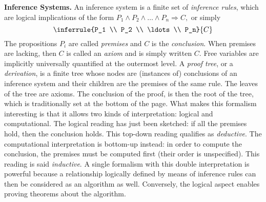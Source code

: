 \textbf{Inference Systems.} An inference system is a finite set of
\emph{inference rules}, which are logical implications of the form
\(P_1 \wedge P_2 \wedge \ldots \wedge P_n \Rightarrow C,\) or simply
\[
\inferrule
  {P_1 \\ P_2 \\ \ldots \\ P_n}
  {C}
\]
The propositions \(P_i\) are called \emph{premises} and \(C\) is the
\emph{conclusion}. When premi\-ses are lacking, then \(C\) is called
an \emph{axiom} and is simply written \(C\). Free variables are
implicitly universally quantified at the outermost level. A
\emph{proof tree}, or a \emph{derivation}, is a finite tree whose
nodes are (instances of) conclusions of an inference system and their
children are the premises of the same rule. The leaves of the tree are
axioms. The conclusion of the proof, is then the root of the tree,
which is traditionally set at the bottom of the page. What makes this
formalism interesting is that it allows two kinds of interpretation:
logical and computational. The logical reading has just been sketched:
if all the premises hold, then the conclusion holds. This
top\hyp{}down reading qualifies as \emph{deductive}. The computational
interpretation is bottom\hyp{}up instead: in order to compute the
conclusion, the premises must be computed first (their order is
unspecified). This reading is said \emph{inductive}. A single
formalism with this double interpretation is powerful because a
relationship logically defined by means of inference rules can then be
considered as an algorithm as well. Conversely, the logical aspect
enables proving theorems about the algorithm.

